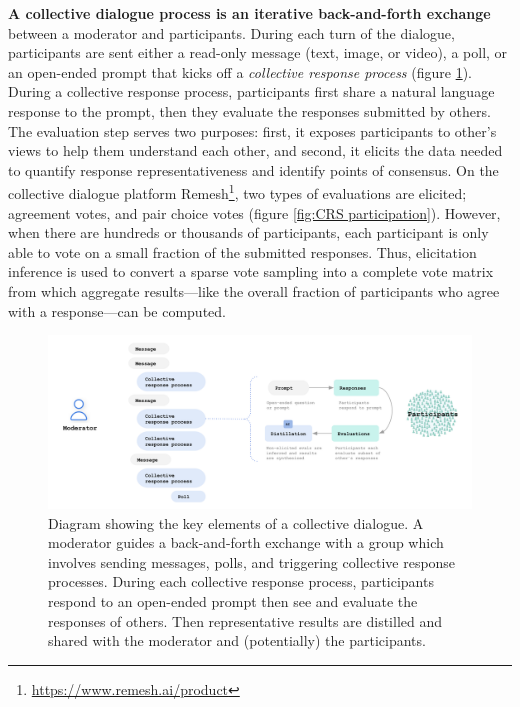 \documentclass{article}
\begin{document}
\textbf{A collective dialogue process is an iterative back-and-forth exchange} between a moderator and participants. During each turn of the dialogue, participants are sent either a read-only message (text, image, or video), a poll, or an open-ended prompt that kicks off a \emph{collective response process} (figure \ref{fig:CD diagram}). During a collective response process\cite{ovadya2023generative}, participants first share a natural language response to the prompt, then they evaluate the responses submitted by others. The evaluation step serves two purposes: first, it exposes participants to other’s views to help them understand each other, and second, it elicits the data needed to quantify response representativeness and identify points of consensus. On the collective dialogue platform Remesh\footnote{\url{https://www.remesh.ai/product}}, two types of evaluations are elicited; agreement votes, and pair choice votes (figure \ref{fig:CRS participation}). However, when there are hundreds or thousands of participants, each participant is only able to vote on a small fraction of the submitted responses. Thus, elicitation inference \cite{konya2022elicitation,bilich2019faster} is used to convert a sparse vote sampling into a complete vote matrix from which aggregate results---like the overall fraction of participants who agree with a response---can be computed. 

\begin{figure}[H]
\vspace{-1.5cm}
\hspace{-1cm}
  \includegraphics[width=1.1\linewidth]{figs/CD_diagram.png}
  \caption{Diagram showing the key elements of a collective dialogue. A moderator guides a back-and-forth exchange with a group which involves sending messages, polls, and triggering collective response processes. During each collective response process, participants respond to an open-ended prompt then see and evaluate the responses of others. Then representative results are distilled and shared with the moderator and (potentially) the participants.}
  \label{fig:CD diagram}
\end{figure}
\end{document}
